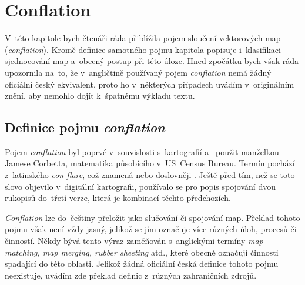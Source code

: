 \chapter{Conflation}
\label{2-conflation}

V~této kapitole bych čtenáři ráda přiblížila pojem sloučení vektorových map
(\textit{conflation}). Kromě definice samotného pojmu kapitola popisuje 
i~klasifikaci sjednocování map a~obecný postup při této úloze. Hned zpočátku
bych však ráda upozornila na~to, že v~angličtině používaný pojem 
\textit{conflation} nemá žádný oficiální český ekvivalent, proto ho v~některých
případech uvádím v~originálním znění, aby nemohlo dojít k~špatnému výkladu 
textu.

\section{Definice pojmu \textit{conflation}}
\label{definice}

Pojem \textit{conflation} byl poprvé v~souvislosti s~kartografií a~
použit manželkou Jamese Corbetta, matematika působícího v~US~Census Bureau.
Termín pochází z~latinského \textit{con flare}, což znamená 
nebo doslovněji . Ještě před tím, než se toto slovo 
objevilo v~digitální kartografii, používalo se pro popis spojování dvou 
rukopisů do~třetí verze, která je kombinací těchto předchozích.

\textit{Conflation} lze do~češtiny přeložit jako slučování či spojování map. 
Překlad tohoto pojmu však není vždy jasný, jelikož se jím označuje více různých 
úloh, procesů či činností. Někdy bývá tento výraz zaměňován s~anglickými 
termíny \textit{map matching, map merging, rubber sheeting} atd., které obecně
označují činnosti spadající do této oblasti. Jelikož žádná oficiální česká
definice tohoto pojmu neexistuje, uvádím zde překlad definic z~různých 
zahraničních zdrojů. 

